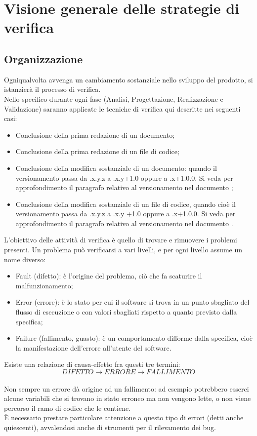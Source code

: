 \section{Visione generale delle strategie di verifica}{
\subsection{Organizzazione}{
	Ogniqualvolta avvenga un cambiamento sostanziale nello sviluppo del prodotto, si istanzierà il processo di verifica. \\
	Nello specifico durante ogni fase (Analisi, Progettazione, Realizzazione e Validazione) saranno applicate le tecniche di verifica qui descritte nei seguenti casi:
	\begin{itemize}
		\item Conclusione della prima redazione di un documento;
		\item Conclusione della prima redazione di un file di codice;
		\item Conclusione della modifica sostanziale di un documento: quando il versionamento passa da .x.y.z a .x.y+1.0 oppure a .x+1.0.0. Si veda per approfondimento il paragrafo relativo al versionamento nel documento \href{run:../../Esterni/\fNormeDiProgetto}{\fEscapeNormeDiProgetto};
		\item Conclusione della modifica sostanziale di un file di codice, quando cioè il versionamento passa da .x.y.z a .x.y +1.0 oppure a .x+1.0.0. Si veda per approfondimento il paragrafo relativo al versionamento nel documento \href{run:../../Esterni/\fNormeDiProgetto}{\fEscapeNormeDiProgetto}.
	\end{itemize}
	L'obiettivo delle attività di verifica è quello di trovare e rimuovere i problemi presenti. Un problema può verificarsi a vari livelli, e per ogni livello assume un nome diverso:
	\begin{itemize}
		\item Fault (difetto): è l'origine del problema, ciò che fa scaturire il malfunzionamento;
		\item Error (errore): è lo stato per cui il software si trova in un punto sbagliato del flusso di esecuzione o con valori sbagliati rispetto a quanto previsto dalla specifica;
		\item Failure (fallimento, guasto): è un comportamento difforme dalla specifica, cioè la manifestazione dell'errore all'utente del software.
	\end{itemize}
	Esiste una relazione di causa-effetto fra questi tre termini:\\
	\[DIFETTO\longrightarrow ERRORE\longrightarrow FALLIMENTO\]\\
	Non sempre un errore dà origine ad un fallimento: ad esempio potrebbero esserci alcune variabili che si trovano in stato erroneo ma non vengono lette, o non viene percorso il ramo di codice che le contiene.\\
	È necessario prestare particolare attenzione a questo tipo di errori (detti anche quiescenti), avvalendosi anche di strumenti per il rilevamento dei bug.
}
}
